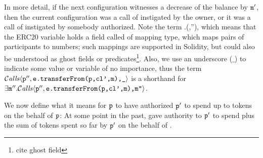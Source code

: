 \noindent
 
 In more detail, if the next configuration witnesses a decrease of the balance by
 ${\mbox{\tt{m}}}'$, then the current configuration was a call of  instigated by
 the owner, or it was a call of  instigated by somebody authorized.
Note the term .(,''), which means that the
ERC20 variable  holds a field called  of   mapping type, which maps pairs of participants to numbers; such
mappings are supported in Solidity\cite{Solidity}, but could also be understood as ghost fields or predicates\footnote{cite ghost field}.
Also, %
we use an underscore ($\_$) to indicate some value or variable of no importance, thus the term ${\mathcal{C}}\textrm{\textit{alls}}\langle {\mbox{\tt{p}}}'',{\mbox{\tt{e.transferFrom(p,cl',m),\_}}}\rangle$ is a shorthand for 
$\exists {\mbox{\tt{m}}}''.{\mathcal{C}}\textrm{\textit{alls}}\langle {\mbox{\tt{p}}}'',{\mbox{\tt{e.transferFrom(p,cl',m),m''}}}\rangle$.

We now define what it means for ${\mbox{\tt{p}}}$ to have authorized ${\mbox{\tt{p}}}'$ to  spend 
up to  tokens on the behalf of ${\mbox{\tt{p}}}$: At some point in the
past,   gave authority to ${\mbox{\tt{p}}}'$  to spend   
plus the sum of  tokens
spent so far by ${\mbox{\tt{p}}}' $ on the behalf of . 

